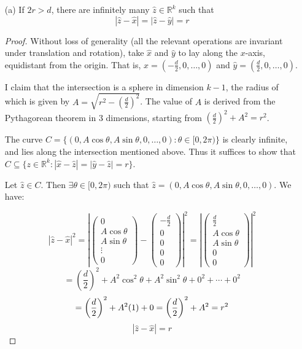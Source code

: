 \documentclass{article}
\newcommand{\R}{\mathbb{R}}
\newcommand{\abs}[1]{\left| #1 \right|}
\newcommand{\paren}[1]{\left( #1 \right)}
\begin{document}
\begin{enumerate}
    \item[(a)] If $2r > d$, there are infinitely many $\hat z \in \R^k$ such that     
    $$\abs{\hat z - \hat x} = \abs{\hat z - \hat y} = r$$

    \begin{proof}
        Without loss of generality (all the relevant operations are invariant under translation and rotation), take $\hat x$ and $\hat y$ to lay along the $x$-axis, equidistant from the origin. That is, $\hat x = \paren{-\frac{d}{2}, 0, \dots, 0}$ and $\hat y = \paren{\frac{d}{2}, 0, \dots, 0}$.

        I claim that the intersection is a sphere in dimension $k - 1$, the radius of which is given by $A = \sqrt{r^2 - \paren{\frac{d}{2}}^2}$. The value of $A$ is derived from the Pythagorean theorem in 3 dimensions, starting from $\paren{\frac{d}{2}}^2 + A^2 = r^2$. 

        The curve $C = \{\paren{0, A \cos \theta, A \sin \theta, 0, \dots, 0} : \theta \in [0, 2\pi)\}$ is clearly infinite, and lies along the intersection mentioned above. Thus it suffices to show that $C \subseteq \{z \in \R^k : \abs{\hat x - \hat z} = \abs{\hat y - \hat z} = r\}$.
        
        Let $\hat z \in C$. Then $\exists \theta \in [0, 2\pi)$ such that $\hat z = \paren{0, A \cos \theta, A \sin \theta, 0, \dots, 0}$. We have:

        $$\abs{\hat z - \hat x}^2 = \abs{\begin{pmatrix}
            0 \\
            A \cos \theta \\
            A \sin \theta \\
            \vdots \\
            0 
            \end{pmatrix} - \begin{pmatrix}
                -\frac{d}{2} \\
                0 \\
                0 \\
                0 \\
                0 
                \end{pmatrix}}^2 = 
        \abs{\begin{pmatrix}
            \frac{d}{2} \\
            A \cos \theta \\
            A \sin \theta \\
            0 \\
            0 
            \end{pmatrix}}^2$$
            $$= \paren{\frac{d}{2}}^2 + A^2\cos^2 \theta + A^2 \sin^2 \theta + 0^2 + \cdots + 0^2$$
            $$= \paren{\frac{d}{2}}^2 + A^2(1) + 0
            \\ = \paren{\frac{d}{2}}^2 + A^2
            \\ = r^2$$
            $$\abs{\hat z - \hat x} = r$$


\end{proof}
\end{enumerate}
\end{document}
